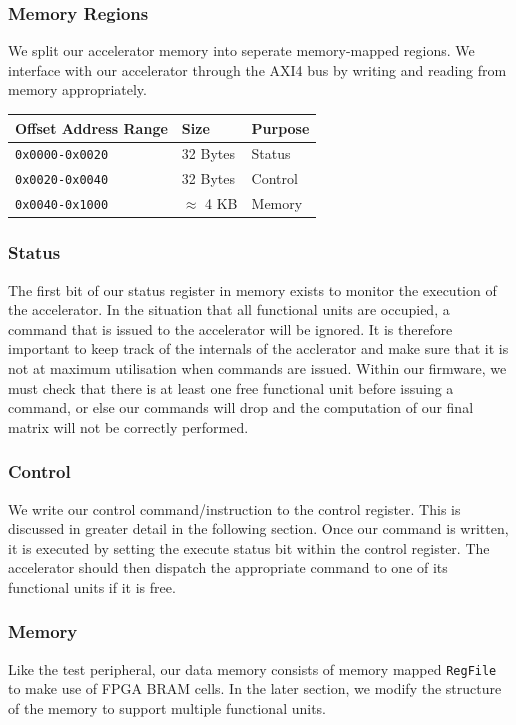\documentclass[a4paper,8pt]{report}
\begin{document}
\subsubsection{Memory Regions}
We split our accelerator memory into seperate memory-mapped regions. We
interface with our accelerator through the AXI4 bus by writing and reading from
memory appropriately.  
\begin{table}
  \centering
  \begin{tabular}{lll}
    \toprule
    Offset Address Range & Size & Purpose \\
    \midrule
    \texttt{0x0000-0x0020} & 32 Bytes & Status \\
    \texttt{0x0020-0x0040} & 32 Bytes & Control \\
    \texttt{0x0040-0x1000} & $\approx$ 4 KB & Memory \\
    \bottomrule
  \end{tabular}
\end{table}

\subsubsection{Status}
The first bit of our status register in memory exists to monitor the execution
of the accelerator. In the situation that all functional units are occupied, a
command that is issued to the accelerator will be ignored. It is therefore
important to keep track of the internals of the acclerator and make sure that it
is not at maximum utilisation when commands are issued. Within our firmware, we
must check that there is at least one free functional unit before issuing a
command, or else our commands will drop and the computation of our final matrix
will not be correctly performed.

\subsubsection{Control}
We write our control command/instruction to the control register. This is
discussed in greater detail in the following section. Once our command is
written, it is executed by setting the execute status bit within the control
register. The accelerator should then dispatch the appropriate command to one of
its functional units if it is free.

\subsubsection{Memory}
Like the test peripheral, our data memory consists of memory mapped
\texttt{RegFile} to make use of FPGA BRAM cells. In the later section, we modify
the structure of the memory to support multiple functional units.
\end{document}
